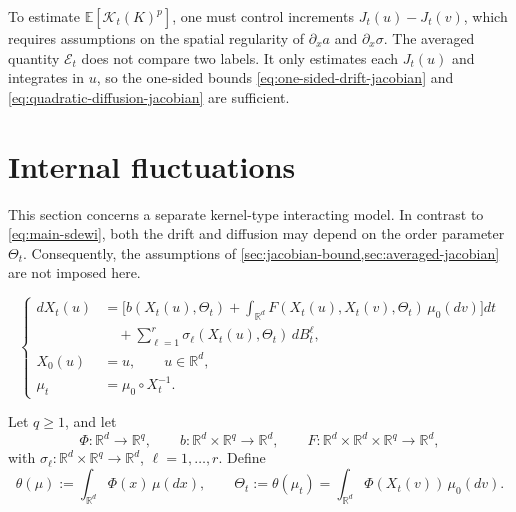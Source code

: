 \documentclass{tsp-short}
\theoremstyle{remark}
\theoremstyle{definition}
\newcommand{\R}{\mathbb{R}} %
\newcommand{\E}{\mathbb E} %
\begin{document}
To estimate \(\E[\mathcal K_t(K)^p]\), one must control increments \(J_t(u)-J_t(v)\), which requires assumptions on the spatial regularity
of \(\partial_x a\) and \(\partial_x\sigma\). The averaged quantity \(\mathcal E_t\) does not compare two labels. It only estimates each \(J_t(u)\)
and integrates in \(u\), so the one-sided bounds \eqref{eq:one-sided-drift-jacobian} and \eqref{eq:quadratic-diffusion-jacobian} are sufficient.

\clearpage

\section{Internal fluctuations}\label{sec:internal-fluctuations}

This section concerns a separate kernel-type interacting model. In contrast to \eqref{eq:main-sdewi}, both the drift and diffusion may depend on
the order parameter \(\Theta_t\). Consequently, the assumptions of \cref{sec:jacobian-bound,sec:averaged-jacobian} are not imposed here.

\begin{equation}\label{eq:kernel-sdewi}
	\begin{cases}
		dX_t(u) & = \bigg[ b(X_t(u),\Theta_t) + \int_{\R^d} F(X_t(u),X_t(v),\Theta_t)\,\mu_0(dv) \bigg]dt \\
		        & \quad+ \sum_{\ell=1}^r \sigma_\ell(X_t(u),\Theta_t)\,dB_t^\ell,                         \\[1mm]
		X_0(u)  & =u,\qquad u\in\R^d,                                                                     \\[1mm]
		\mu_t   & =\mu_0\circ X_t^{-1}.
	\end{cases}
\end{equation}

Let \(q\ge1\), and let
\begin{equation*}
	\Phi:\R^d\to\R^q,\qquad b:\R^d\times\R^q\to\R^d,\qquad F:\R^d\times\R^d\times\R^q\to\R^d,
\end{equation*}
with \(\sigma_\ell:\R^d\times\R^q\to\R^d\), \(\ell=1,\dots,r\). Define
\begin{equation*}
	\theta(\mu):=\int_{\R^d}\Phi(x)\,\mu(dx), \qquad \Theta_t:=\theta(\mu_t)=\int_{\R^d}\Phi(X_t(v))\,\mu_0(dv).
\end{equation*}
\end{document}
